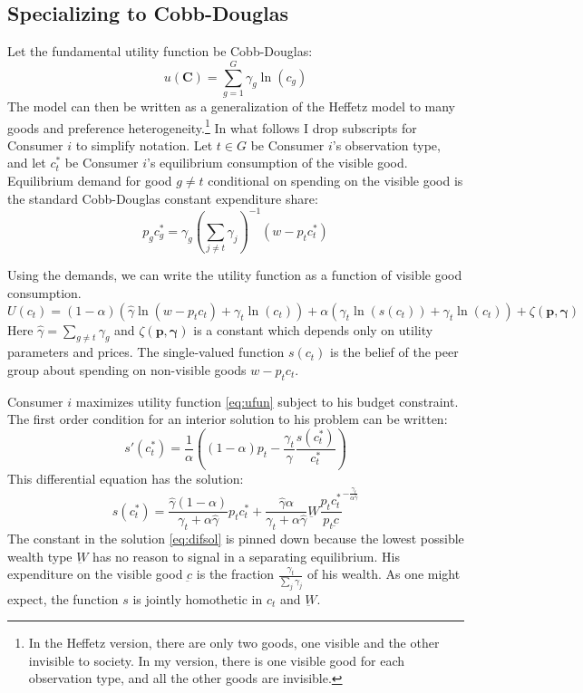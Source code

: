 \subsection{Specializing to Cobb-Douglas}

Let the fundamental utility function be Cobb-Douglas:
\[u(\mathbf{C}) = \sum_{g=1}^{G} \gamma_g \ln(c_g)\]
The model can then be written as a generalization of the Heffetz model to many goods and preference heterogeneity.\footnote{ In the Heffetz version, there are only two goods, one visible and the other invisible to society. In my version, there is one visible good for each observation type, and all the other goods are invisible.}
In what follows I drop subscripts for Consumer $i$ to simplify notation. Let $t \in G$ be Consumer $i$'s observation type, and let $c_{t}^*$ be Consumer $i$'s equilibrium consumption of the visible good.  Equilibrium demand for good $g\neq t$ conditional on spending on the visible good is the standard Cobb-Douglas constant expenditure share:
\begin{equation}
    \label{eq:opt_cobb}
    p_g c_g^* = \gamma_g\left(\sum_{j\neq t} \gamma_j\right)^{-1}\left(w-p_t c_t^* \right)
\end{equation}

Using the demands, we can write the utility function as a function of visible good consumption.
\begin{equation}
    \label{eq:ufun}
    U(c_t) = (1-\alpha) \left(\hat{\gamma} \ln \left(w-p_t c_t\right) + \gamma_t \ln \left(c_t \right)\right) + \alpha \left(\gamma_t \ln \left(s(c_t)\right) + \gamma_t \ln \left(c_t\right) \right) + \zeta(\mathbf{p},\mathbf{\gamma})
\end{equation}
Here $\hat{\gamma} = \sum_{g\neq t} \gamma_g$ and $\zeta(\mathbf{p},\mathbf{\gamma})$ is a constant which depends only on utility parameters and prices.  The single-valued function $s(c_t)$ is the belief of the peer group about spending on non-visible goods $w-p_t c_t$. 

Consumer $i$ maximizes utility function \eqref{eq:ufun} subject to his budget constraint.  The first order condition for an interior solution to his problem can be written:
\begin{equation}
	\label{foc}
s'(c_t^*) = \frac{1}{\alpha}\left( \left( 1-\alpha\right) p_t - \frac{\gamma_t}{\hat{\gamma}}\frac{s(c_t^*)}{c_t^*}\right)
\end{equation}
This differential equation has the solution:
\begin{equation}
	\label{eq:difsol}
    s(c_t^*) = \frac{\hat{\gamma}\left(1-\alpha\right)}{\gamma_t +\alpha \hat{\gamma}} p_t c_t^* +  \frac{\hat{\gamma} \alpha }{\gamma_t + \alpha \hat{\gamma}} \underbar{W}\frac{p_t c_t^*}{p_t \underbar{c}}^{-\frac{\gamma_t}{\alpha \hat{\gamma}}}
\end{equation}
The constant in the solution \eqref{eq:difsol} is pinned down because the lowest possible wealth type $\underbar{W}$ has no reason to signal in a separating equilibrium.  His expenditure on the visible good $\underbar{c}$ is the fraction $\frac{\gamma_t}{\sum_j \gamma_j}$ of his wealth.  As one might expect, the function $s$ is jointly homothetic in $c_t$ and $\underbar{W}$.

